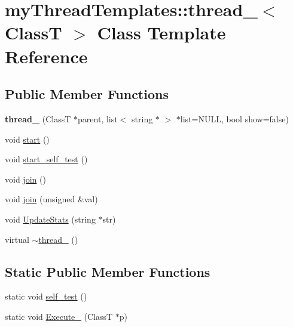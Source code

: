 \hypertarget{classmyThreadTemplates_1_1thread__1}{
\section{myThreadTemplates::thread\_$<$ ClassT $>$ Class Template Reference}
\label{classmyThreadTemplates_1_1thread__1}
}
\subsection*{Public Member Functions}
\begin{DoxyCompactItemize}
\item 
\hypertarget{classmyThreadTemplates_1_1thread__1_a5d23c11a3857a83282ae408c1066c311}{
{\bfseries thread\_} (ClassT $\ast$parent, list$<$ string $\ast$ $>$ $\ast$list=NULL, bool show=false)}
\label{classmyThreadTemplates_1_1thread__1_a5d23c11a3857a83282ae408c1066c311}

\item 
void \hyperlink{classmyThreadTemplates_1_1thread__1_a40dcf528dbb18b16ed44054451a575e1}{start} ()
\item 
void \hyperlink{classmyThreadTemplates_1_1thread__1_aaa171242d5355f2a472a566d30863894}{start\_\-self\_\-test} ()
\item 
void \hyperlink{classmyThreadTemplates_1_1thread__1_ae393ee33ecbfee158a03a4c0f21cf95c}{join} ()
\item 
void \hyperlink{classmyThreadTemplates_1_1thread__1_a7acc2e784a8efe4b74a4bdded5feebb3}{join} (unsigned \&val)
\item 
void \hyperlink{classmyThreadTemplates_1_1thread__1_a2cd2286a9d51537395123832a6a25ebc}{UpdateStats} (string $\ast$str)
\item 
virtual \hyperlink{classmyThreadTemplates_1_1thread__1_aab0cedc80707090ec300be40e68c19c1}{$\sim$thread\_} ()
\end{DoxyCompactItemize}
\subsection*{Static Public Member Functions}
\begin{DoxyCompactItemize}
\item 
static void \hyperlink{classmyThreadTemplates_1_1thread__1_add97f72749590d4023fd23fcd0a3dece}{self\_\-test} ()
\item 
static void \hyperlink{classmyThreadTemplates_1_1thread__1_a24e615ac4afa0d376faefd500ed47e43}{Execute\_\-} (ClassT $\ast$p)
\end{DoxyCompactItemize}
